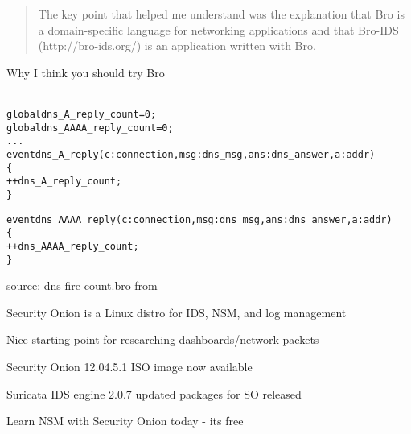 \documentclass[20pt,landscape,a4paper,footrule]{foils}
\begin{document}
\begin{quote}
	The key point that helped me understand was the explanation that Bro is a
               domain-specific language for networking applications and that Bro-IDS
               (http://bro-ids.org/) is an application written with Bro.
\end{quote}

Why I think you should try Bro\\
\\


\begin{alltt}\small
global dns_A_reply_count=0;
global dns_AAAA_reply_count=0;
...
event dns_A_reply(c: connection, msg: dns_msg, ans: dns_answer, a: addr)
	\{
	++dns_A_reply_count;
	\}

event dns_AAAA_reply(c: connection, msg: dns_msg, ans: dns_answer, a: addr)
	\{
	++dns_AAAA_reply_count;
	\}
\end{alltt}

source: dns-fire-count.bro from\\
{\small {}}




\begin{list2}
\item Security Onion is a Linux distro for IDS, NSM, and log management
\item {}
\item {}
\end{list2}

\centerline{Nice starting point for researching dashboards/network packets}


\begin{list2}
\item Security Onion 12.04.5.1 ISO image now available
\item Suricata IDS engine 2.0.7 updated packages for SO released
\item Learn NSM with Security Onion today - its free
\end{list2}
{\small{}\\
}
\end{document}
